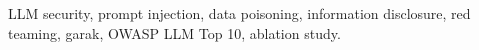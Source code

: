 \documentclass[journal,onecolumn,11pt]{IEEEtran}
\begin{document}
\begin{IEEEkeywords}
LLM security, prompt injection, data poisoning, information disclosure,
red teaming, garak, OWASP LLM Top 10, ablation study.
\end{IEEEkeywords}












\end{document}
